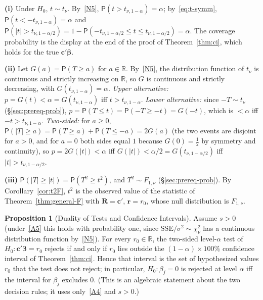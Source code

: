 \documentclass[12pt,a4paper]{article}
\makeatletter
\theoremstyle{definition}
\newtheorem{proposition}[theorem]{Proposition}
\renewenvironment{proof}[1][\proofname]{\par
  \pushQED{\qed}%
  \normalfont \topsep6\p@\@plus6\p@\relax
  \trivlist
  \item[\hskip\labelsep\bfseries #1\@addpunct{.}]\ignorespaces
}{%
  \popQED\endtrivlist\@endpefalse
}
\newcommand\prb{\mathsf{P}}
\newcommand{\SSE}{\mathrm{SSE}}
\def\bb{\boldsymbol{\beta}}
\newcommand{\bR}{\mathbf{R}}
\newcommand{\br}{\mathbf{r}}
\def\bc{\mathbf{c}}
\newcommand{\Real}{\mathbb{R}}
\makeatother
\begin{document}
\begin{proof}
\textbf{(i)} Under $H_0$, $t \sim t_\nu$. By~\ref{N5}, $\prb(t > t_{\nu,1-\alpha}) = \alpha$; by~\eqref{eq:t-symm}, $\prb(t < -t_{\nu,1-\alpha}) = \alpha$ and $\prb(|t| > t_{\nu,1-\alpha/2}) = 1 - \prb(-t_{\nu,1-\alpha/2} \leqslant t \leqslant t_{\nu,1-\alpha/2}) = \alpha$. The coverage probability is the display at the end of the proof of Theorem~\ref{thm:ci}, which holds for the true $\bc'\bb$.

\textbf{(ii)} Let $G(a) = \prb(T \geqslant a)$ for $a \in \Real$. By~\ref{N5}, the distribution function of $t_\nu$ is continuous and strictly increasing on $\Real$, so $G$ is continuous and strictly decreasing, with $G(t_{\nu,1-\alpha}) = \alpha$. \emph{Upper alternative:} $p = G(t) < \alpha = G(t_{\nu,1-\alpha})$ iff $t > t_{\nu,1-\alpha}$. \emph{Lower alternative:} since $-T \sim t_\nu$ (\S\ref{sec:prereq-prob}), $p = \prb(T \leqslant t) = \prb(-T \geqslant -t) = G(-t)$, which is $< \alpha$ iff $-t > t_{\nu,1-\alpha}$. \emph{Two-sided:} for $a \geqslant 0$, $\prb(|T| \geqslant a) = \prb(T \geqslant a) + \prb(T \leqslant -a) = 2G(a)$ (the two events are disjoint for $a > 0$, and for $a = 0$ both sides equal $1$ because $G(0) = \frac{1}{2}$ by symmetry and continuity), so $p = 2G(|t|) < \alpha$ iff $G(|t|) < \alpha/2 = G(t_{\nu,1-\alpha/2})$ iff $|t| > t_{\nu,1-\alpha/2}$.

\textbf{(iii)} $\prb(|T| \geqslant |t|) = \prb(T^2 \geqslant t^2)$, and $T^2 \sim F_{1,\nu}$ (\S\ref{sec:prereq-prob}). By Corollary~\ref{cor:t2F}, $t^2$ is the observed value of the statistic of Theorem~\ref{thm:general-F} with $\bR = \bc'$, $\br = r_0$, whose null distribution is $F_{1,\nu}$.
\end{proof}

\begin{proposition}[Duality of Tests and Confidence Intervals]\label{prop:duality}
Assume $s > 0$ (under~\ref{A5} this holds with probability one, since $\SSE/\sigma^2 \sim \chi^2_\nu$ has a continuous distribution function by~\ref{N5}). For every $r_0 \in \Real$, the two-sided level-$\alpha$ test of $H_0\colon \bc'\bb = r_0$ rejects if and only if $r_0$ lies outside the $(1-\alpha) \times 100\%$ confidence interval of Theorem~\ref{thm:ci}. Hence that interval is the set of hypothesized values $r_0$ that the test does not reject; in particular, $H_0\colon \beta_j = 0$ is rejected at level $\alpha$ iff the interval for $\beta_j$ excludes $0$. (This is an algebraic statement about the two decision rules; it uses only~\ref{A4} and $s > 0$.)
\end{proposition}
\end{document}
